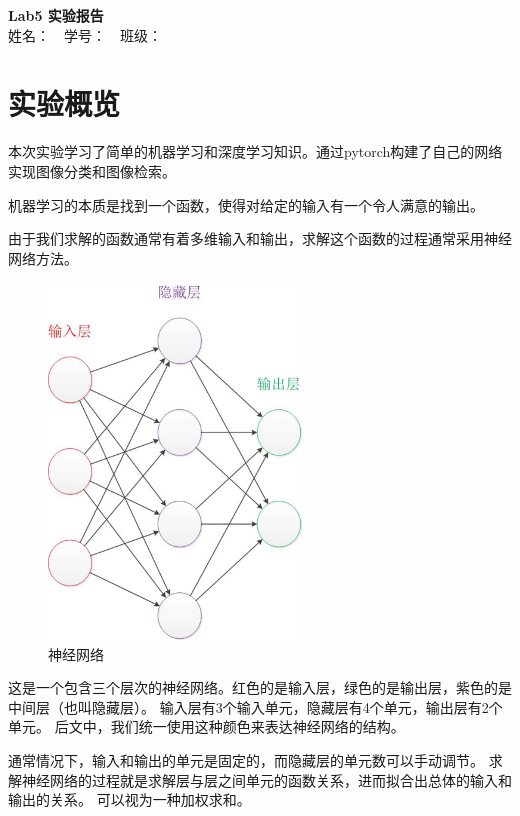 \documentclass{article}
\begin{document}
\begin{center}
    \Large \textbf{Lab5 实验报告}\\
    \vspace{1em}
    姓名：~~学号：~~班级：
\end{center}

\section{实验概览}

    本次实验学习了简单的机器学习和深度学习知识。通过pytorch构建了自己的网络实现图像分类和图像检索。

    机器学习的本质是找到一个函数，使得对给定的输入有一个令人满意的输出。

    由于我们求解的函数通常有着多维输入和输出，求解这个函数的过程通常采用神经网络方法。

\begin{figure}[h]
\centering
\includegraphics[width=0.6\textwidth]{figure/img1}
\caption{神经网络}
\end{figure}

    这是一个包含三个层次的神经网络。红色的是输入层，绿色的是输出层，紫色的是中间层（也叫隐藏层）。
    输入层有3个输入单元，隐藏层有4个单元，输出层有2个单元。
    后文中，我们统一使用这种颜色来表达神经网络的结构。

    通常情况下，输入和输出的单元是固定的，而隐藏层的单元数可以手动调节。
    求解神经网络的过程就是求解层与层之间单元的函数关系，进而拟合出总体的输入和输出的关系。
    可以视为一种加权求和。
\end{document}
